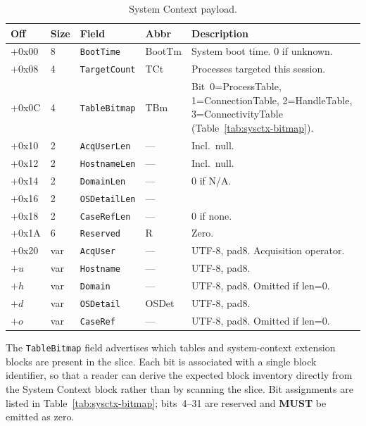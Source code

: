 \documentclass[11pt,a4paper]{article}
\newcommand{\MUST}{\textbf{MUST}}
\newcommand{\field}[1]{\texttt{#1}}
\begin{document}
\begin{table}[H]\centering\caption{System Context payload.}\label{tab:sysctx}\small
\begin{tabular}{M M l l p{3.5cm}}\toprule\textbf{Off}&\textbf{Size}&\textbf{Field}&\textbf{Abbr}&\textbf{Description}\\\midrule
+0x00 & 8 & \field{BootTime} & BootTm & System boot time. 0 if unknown. \\
+0x08 & 4 & \field{TargetCount} & TCt & Processes targeted this session. \\
+0x0C & 4 & \field{TableBitmap} & TBm & Bit~0=ProcessTable, 1=ConnectionTable, 2=HandleTable, 3=ConnectivityTable (Table~\ref{tab:sysctx-bitmap}). \\
+0x10 & 2 & \field{AcqUserLen} & --- & Incl.\ null. \\
+0x12 & 2 & \field{HostnameLen} & --- & Incl.\ null. \\
+0x14 & 2 & \field{DomainLen} & --- & 0 if N/A. \\
+0x16 & 2 & \field{OSDetailLen} & --- & \\
+0x18 & 2 & \field{CaseRefLen} & --- & 0 if none. \\
+0x1A & 6 & \field{Reserved} & R & Zero. \\
+0x20 & var & \field{AcqUser} & --- & UTF-8, pad8. Acquisition operator. \\
$+u$ & var & \field{Hostname} & --- & UTF-8, pad8. \\
$+h$ & var & \field{Domain} & --- & UTF-8, pad8. Omitted if len=0. \\
$+d$ & var & \field{OSDetail} & OSDet & UTF-8, pad8. \\
$+o$ & var & \field{CaseRef} & --- & UTF-8, pad8. Omitted if len=0. \\\bottomrule
\end{tabular}\end{table}

The \field{TableBitmap} field advertises which tables and system-context
extension blocks are present in the slice. Each bit is associated with a
single block identifier, so that a reader can derive the expected block
inventory directly from the System Context block rather than by scanning
the slice. Bit assignments are listed in Table~\ref{tab:sysctx-bitmap};
bits~4--31 are reserved and \MUST{} be emitted as zero.
\end{document}
